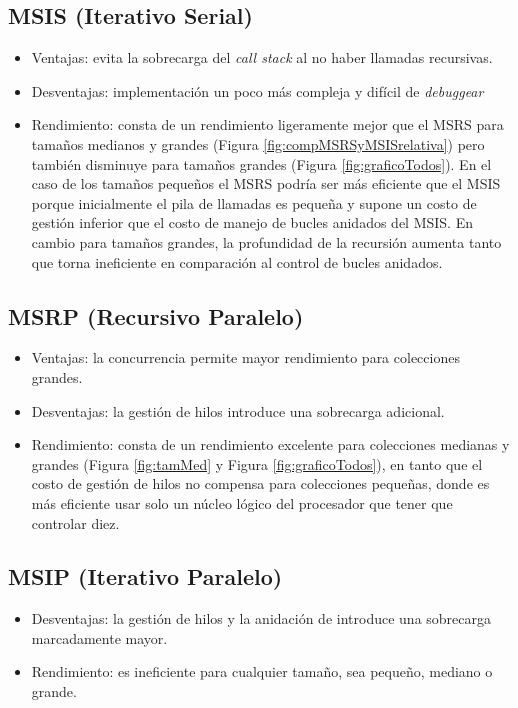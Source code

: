 \documentclass[titlepage]{article}
\begin{document}
\subsection{MSIS (Iterativo Serial)} %
\begin{itemize}
	\item Ventajas: evita la sobrecarga del \textit{call stack} al no haber llamadas recursivas.
	\item Desventajas: implementación un poco más compleja y difícil de \textit{debuggear}
	\item Rendimiento: consta de un rendimiento ligeramente mejor que el MSRS para tamaños medianos y grandes (Figura \ref{fig:compMSRSyMSISrelativa}) pero también disminuye para tamaños grandes (Figura \ref{fig:graficoTodos}). En el caso de los tamaños pequeños el MSRS podría ser más eficiente que el MSIS porque inicialmente el pila de llamadas es pequeña y supone un costo de gestión inferior que el costo de manejo de bucles anidados del MSIS. En cambio para tamaños grandes, la profundidad de la recursión aumenta tanto que torna ineficiente en comparación al control de bucles anidados.
\end{itemize}

\subsection{MSRP (Recursivo Paralelo)}%
\begin{itemize}
	\item Ventajas: la concurrencia permite mayor rendimiento para colecciones grandes.
	\item Desventajas: la gestión de hilos introduce una sobrecarga adicional.
	\item Rendimiento: consta de un rendimiento excelente para colecciones medianas y grandes (Figura \ref{fig:tamMed} y Figura \ref{fig:graficoTodos}), en tanto que el costo de gestión de hilos no compensa para colecciones pequeñas, donde es más eficiente usar solo un núcleo lógico del procesador que tener que controlar diez.
\end{itemize}
\subsection{MSIP (Iterativo Paralelo)}%
\begin{itemize}
	\item Desventajas: la gestión de hilos y la anidación de introduce una sobrecarga marcadamente mayor.
	\item Rendimiento: es ineficiente para cualquier tamaño, sea pequeño, mediano o grande.
\end{itemize}
\end{document}
